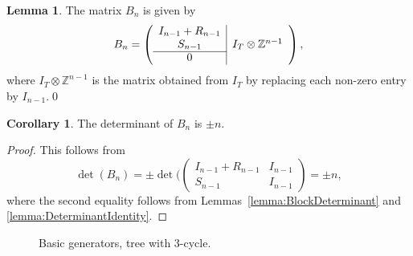 \documentclass[12pt]{amsart}
\theoremstyle{definition}
\newtheorem{lemma}[theorem]{Lemma}
\newtheorem{corollary}[theorem]{Corollary}
\numberwithin{equation}{section}
\def\S{\Sigma}
\def\Z{\mathbb{Z}}
\begin{document}
\begin{lemma}
The matrix $B_n$ is given by
\begin{equation}
B_n=\left(\begin{array}{c|c}
I_{n-1}+R_{n-1}& \\
S_{n-1}&I_T\otimes\Z^{n-1}\\\cline{1-1}
 0 &
\end{array}\right),
\end{equation}
where $I_T\otimes\Z^{n-1}$ is the matrix obtained from $I_T$ by replacing each non-zero entry by $I_{n-1}$.\qed
\end{lemma}
\begin{corollary}
The determinant of $B_n$ is $\pm n$.
\end{corollary}
\begin{proof}
This follows from
\begin{equation}
\det(B_n)=\pm\det(\begin{pmatrix}I_{n-1}+R_{n-1}&I_{n-1}\\S_{n-1}&I_{n-1}\end{pmatrix}=\pm n,
\end{equation}
where the second equality follows from Lemmas~\ref{lemma:BlockDeterminant} and \ref{lemma:DeterminantIdentity}.
\end{proof}
\begin{figure}[htpb]
\centering
\begin{minipage}[c]{0.48\textwidth}
\scalebox{0.8}{}
\captionsetup{width=10cm}
\caption{Basic generators, tree with $1$-cycle.}\label{fig:OneCycleBasic}
\end{minipage}	
\begin{minipage}[c]{0.48\textwidth}
\scalebox{0.8}{}
\captionsetup{width=10cm}
\caption{Basic generators, tree with $3$-cycle.}\label{fig:ThreeCycleBasic}
\end{minipage}					
\end{figure}
\end{document}
